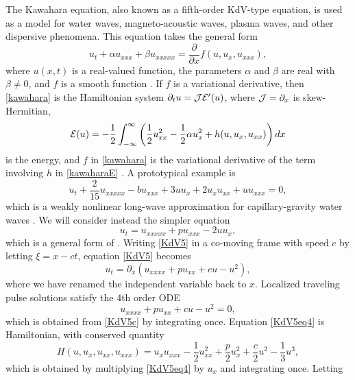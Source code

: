 \documentclass[12pt]{elsarticle}
\theoremstyle{plain}
\theoremstyle{definition}
\theoremstyle{remark}
\numberwithin{theorem}{section}
\numberwithin{equation}{section}
\begin{document}
The Kawahara equation, also known as a fifth-order KdV-type equation, is used as a model for water waves, magneto-acoustic waves, plasma waves, and other dispersive phenomena. This equation takes the general form
\begin{equation}\label{kawahara}
u_t + \alpha u_{xxx} + \beta u_{xxxxx} = \frac{\partial}{\partial x} f(u, u_x, u_{xxx}),
\end{equation}
where $u(x, t)$ is a real-valued function, the parameters $\alpha$ and $\beta$ are real with $\beta \neq 0$, and $f$ is a smooth function \cite{Bridges2002,Bridges2002a}. If $f$ is a variational derivative, then \cref{kawahara} is the Hamiltonian system $\partial_t u = \mathcal{J} \mathcal{E}'(u)$, where $\mathcal{J} = \partial_x$ is skew-Hermitian,
\begin{equation}\label{kawaharaE}
\mathcal{E}(u) = -\frac{1}{2}\int_{-\infty}^\infty 
\left( \frac{1}{2}u_{xx}^2 - \frac{1}{2}\alpha u_x^2 + h(u, u_x, u_{xx})\right)dx
\end{equation}
is the energy, and $f$ in \cref{kawahara} is the variational derivative of the term involving $h$ in \cref{kawaharaE} \cite{Bridges2002}. A prototypical example is
\[
u_t + \frac{2}{15}u_{xxxxx} - b u_{xxx} + 3 u u_x + 2 u_x u_{xx} + u u_{xxx} = 0,
\]
which is a weakly nonlinear long-wave approximation for capillary-gravity water waves \cite{Champneys1998,Champneys1997}. We will consider instead the simpler equation 
\begin{equation}\label{KdV5}
u_t = u_{xxxxx} + p u_{xxx} - 2 u u_x,
\end{equation}
which is a general form of \cite[(1)]{Pelinovsky2007}. Writing \cref{KdV5} in a co-moving frame with speed $c$ by letting $\xi = x - ct$, equation \cref{KdV5} becomes
\begin{equation}\label{KdV5c}
u_t = \partial_x(u_{xxxx} + p u_{xx} + cu - u^2),
\end{equation}
where we have renamed the independent variable back to $x$. Localized traveling pulse solutions satisfy the 4th order ODE
\begin{equation}\label{KdV5eq4}
u_{xxxx} + p u_{xx} + c u - u^2 = 0,
\end{equation}
which is obtained from \cref{KdV5c} by integrating once. Equation \cref{KdV5eq4} is Hamiltonian, with conserved quantity
\begin{equation}\label{KdV5ham}
H(u, u_x, u_{xx}, u_{xxx}) = u_x u_{xxx} - \frac{1}{2}u_{xx}^2 + \frac{p}{2}u_x^2 + \frac{c}{2}u^2 - \frac{1}{3}u^3,
\end{equation}
which is obtained by multiplying \cref{KdV5eq4} by $u_x$ and integrating once. Letting
\end{document}
